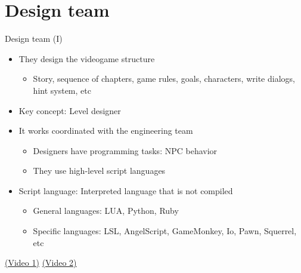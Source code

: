 \documentclass[10pt,compress]{beamer} %
\begin{document}
\section{Design team}
\begin{frame}{Design team (I)}
	\begin{itemize}
	\item They design the videogame structure
		\begin{itemize}
		\item Story, sequence of chapters, game rules, goals, characters, write dialogs, hint system, etc
		\end{itemize}
	\item Key concept: \alert{Level designer}
	\item It works coordinated with the engineering team
		\begin{itemize}
		\item Designers have programming tasks: NPC behavior
		\item They use high-level script languages
		\end{itemize}
	\item Script language: Interpreted language that is not compiled
		\begin{itemize}
		\item General languages: LUA, Python, Ruby
		\item Specific languages: LSL, AngelScript, GameMonkey, Io, Pawn, Squerrel, etc
		\end{itemize}
	\end{itemize}
	\href{http://www.youtube.com/watch?v=KoEGyk6amq0}{(Video 1)} \href{http://www.youtube.com/watch?v=ELKi3hJkSwE}{(Video 2)}
\end{frame}
\end{document}
